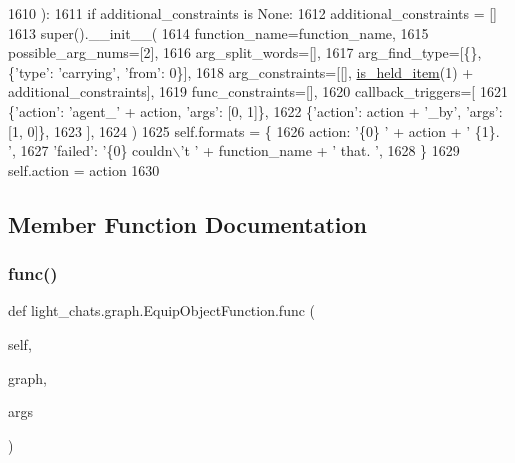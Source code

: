 \begin{DoxyCode}
1610     ):
1611         \textcolor{keywordflow}{if} additional\_constraints \textcolor{keywordflow}{is} \textcolor{keywordtype}{None}:
1612             additional\_constraints = []
1613         super().\_\_init\_\_(
1614             function\_name=function\_name,
1615             possible\_arg\_nums=[2],
1616             arg\_split\_words=[],
1617             arg\_find\_type=[\{\}, \{\textcolor{stringliteral}{'type'}: \textcolor{stringliteral}{'carrying'}, \textcolor{stringliteral}{'from'}: 0\}],
1618             arg\_constraints=[[], \hyperlink{namespacelight__chats_1_1graph_aa0be6ee7e9f549a7195bea9dfb962ad6}{is\_held\_item}(1) + additional\_constraints],
1619             func\_constraints=[],
1620             callback\_triggers=[
1621                 \{\textcolor{stringliteral}{'action'}: \textcolor{stringliteral}{'agent\_'} + action, \textcolor{stringliteral}{'args'}: [0, 1]\},
1622                 \{\textcolor{stringliteral}{'action'}: action + \textcolor{stringliteral}{'\_by'}, \textcolor{stringliteral}{'args'}: [1, 0]\},
1623             ],
1624         )
1625         self.formats = \{
1626             action: \textcolor{stringliteral}{'\{0\} '} + action + \textcolor{stringliteral}{' \{1\}. '},
1627             \textcolor{stringliteral}{'failed'}: \textcolor{stringliteral}{'\{0\} couldn\(\backslash\)'t '} + function\_name + \textcolor{stringliteral}{' that. '},
1628         \}
1629         self.action = action
1630 
\end{DoxyCode}


\subsection{Member Function Documentation}
\mbox{\label{classlight__chats_1_1graph_1_1EquipObjectFunction_a4eaec48030f12c92dcddf9f976b31604}} 
\subsubsection{\texorpdfstring{func()}{func()}}
{\footnotesize\ttfamily def light\+\_\+chats.\+graph.\+Equip\+Object\+Function.\+func (\begin{DoxyParamCaption}\item[{}]{self,  }\item[{}]{graph,  }\item[{}]{args }\end{DoxyParamCaption})}

